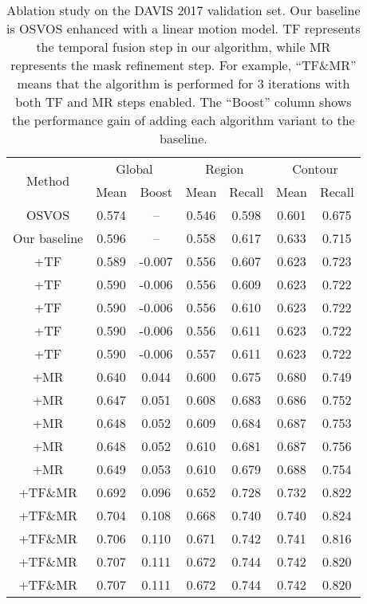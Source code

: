\documentclass[10pt,twocolumn,letterpaper]{article}
\begin{document}
\begin{table}[t!]\footnotesize
\begin{center}
 \begin{tabular}{ccccccc}
\hline
\multirow{2}{*}{Method} & \multicolumn{2}{c}{Global} & \multicolumn{2}{c}{Region }    & \multicolumn{2}{c}{Contour } \\
& Mean & Boost & Mean & Recall & Mean & Recall  \\
\hline
\hline
OSVOS \cite{caelles2017one}  & 0.574 & -- & 0.546 & 0.598 & 0.601 & 0.675\\
Our baseline                 & 0.596 & -- & 0.558 & 0.617 & 0.633 & 0.715\\
+TF                & 0.589 & -0.007  & 0.556 & 0.607 & 0.623 & 0.723\\
+TF                & 0.590 & -0.006  & 0.556 & 0.609 & 0.623 & 0.722\\
+TF                & 0.590 & -0.006  & 0.556 & 0.610 & 0.623 & 0.722\\
+TF                & 0.590 & -0.006  & 0.556 & 0.611 & 0.623 & 0.722\\
+TF                & 0.590 & -0.006  & 0.557 & 0.611 & 0.623 & 0.722\\
+MR                & 0.640 & 0.044  & 0.600 & 0.675 & 0.680 & 0.749\\
+MR                & 0.647 & 0.051  & 0.608 & 0.683 & 0.686 & 0.752\\
+MR                & 0.648 & 0.052  & 0.609 & 0.684 & 0.687 & 0.753\\
+MR                & 0.648 & 0.052  & 0.610 & 0.681 & 0.687 & 0.756\\
+MR                & 0.649 & 0.053  & 0.610 & 0.679 & 0.688 & 0.754\\
+TF\&MR        & 0.692 & 0.096  & 0.652 & 0.728 & 0.732 & 0.822\\
+TF\&MR        & 0.704 & 0.108  & 0.668 & 0.740 & 0.740 & 0.824\\
+TF\&MR        & 0.706 & 0.110  & 0.671 & 0.742 & 0.741 & 0.816\\
+TF\&MR        & 0.707 & 0.111  & 0.672 & 0.744 & 0.742 & 0.820\\
+TF\&MR        & 0.707 & 0.111  & 0.672 & 0.744 & 0.742 & 0.820\\
\hline
\end{tabular}
\end{center}
\vspace{-5mm}
\caption{Ablation study on the DAVIS 2017 validation set. Our baseline is OSVOS enhanced with a linear motion model.
TF represents the temporal fusion step in our algorithm, while MR represents the mask refinement step.
For example, ``TF\&MR'' means that the algorithm is performed for 3 iterations with both TF and MR steps enabled.
The ``Boost'' column shows the performance gain of adding each algorithm variant to the baseline.}
\vspace{-3.5mm}
\label{table.ablationstudy}
\end{table}
\end{document}
